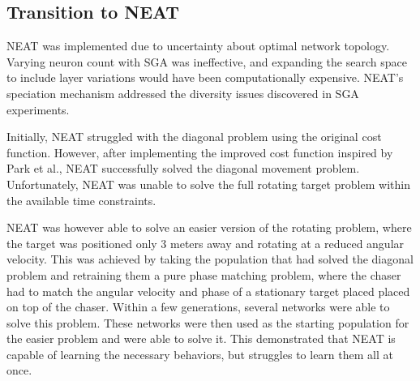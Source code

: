\subsection{Transition to NEAT}

NEAT was implemented due to uncertainty about optimal network topology. Varying neuron count with SGA was ineffective, and expanding the search space to include layer variations would have been computationally expensive. NEAT's speciation mechanism addressed the diversity issues discovered in SGA experiments.

Initially, NEAT struggled with the diagonal problem using the original cost function. However, after implementing the improved cost function inspired by Park et al., NEAT successfully solved the diagonal movement problem. Unfortunately, NEAT was unable to solve the full rotating target problem within the available time constraints. 

NEAT was however able to solve an easier version of the rotating problem, where the target was positioned only 3 meters away and rotating at a reduced angular velocity. This was achieved by taking the population that had solved the diagonal problem and retraining them a pure phase matching problem, where the chaser had to match the angular velocity and phase of a stationary target placed placed on top of the chaser. Within a few generations, several networks were able to solve this problem. These networks were then used as the starting population for the easier problem and were able to solve it. This demonstrated that NEAT is capable of learning the necessary behaviors, but struggles to learn them all at once.


